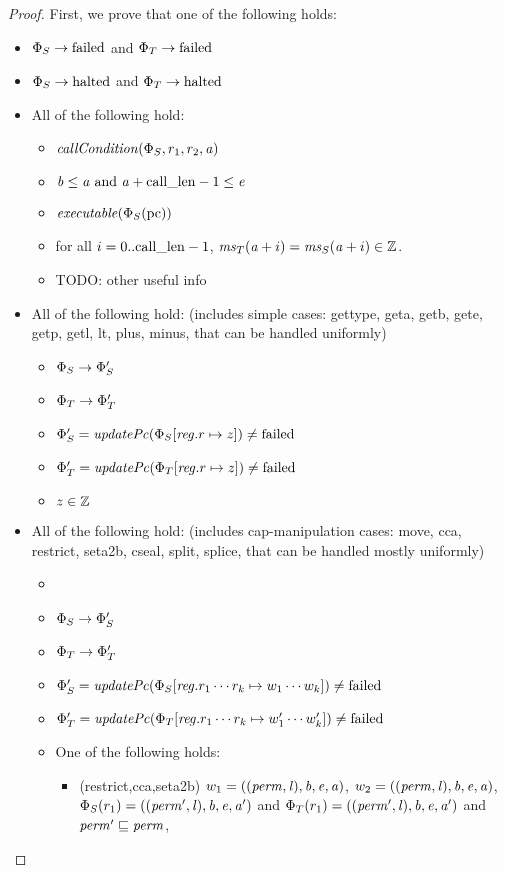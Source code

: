 \documentclass[a4paper]{article}
\begin{document}
\begin{proof}
{\color{DarkGreen}
First, we prove that one of the following holds:
\begin{itemize}
\item $\Phi_S \rightarrow \mathrm{failed}$ and $\Phi_T \rightarrow\mathrm{failed}$
\item $\Phi_S \rightarrow \mathrm{halted}$ and $\Phi_T \rightarrow\mathrm{halted}$
\item All of the following hold:
  \begin{itemize}
  \item $\callCond{\Phi_S,r_1,r_2,\aaddr}$
  \item $\mathit{b} \leq \mathit{a} \text{ and } \mathit{a} + \mathrm{call\_len}-1 \leq \mathit{e}$
  \item $\exec{\Phi_S(\pcreg)}$
  \item for all $i = 0..\mathrm{call\_len}-1$, $\mathit{ms}_T(\mathit{a}+i) = \mathit{ms}_S(\mathit{a}+i) \in \mathbb{Z}$.
  \item TODO: other useful info
  \end{itemize}
\item All of the following hold: (includes simple cases: gettype, geta, getb, gete, getp, getl, lt, plus, minus, that can be handled uniformly)
  \begin{itemize}
  \item $\Phi_S \rightarrow \Phi_S'$
  \item $\Phi_T \rightarrow \Phi_T'$
  \item $\Phi_S' = \updPcAddr{\Phi_S\updReg{r}{z}} \neq \failed$
  \item $\Phi_T' = \updPcAddr{\Phi_T\updReg{r}{z}} \neq \failed$
  \item $z \in \mathbb{Z}$
  \end{itemize}
\item All of the following hold: (includes cap-manipulation cases: move, cca, restrict, seta2b, cseal, split, splice, that can be handled mostly uniformly)
  \begin{itemize}
  \item \item $\Phi_S \rightarrow \Phi_S'$
  \item $\Phi_T \rightarrow \Phi_T'$
  \item $\Phi_S' = \updPcAddr{\Phi_S\updReg{r_1\cdots r_k}{w_1\cdots w_k}}\neq \failed$
  \item $\Phi_T' = \updPcAddr{\Phi_T\updReg{r_1\cdots r_k}{w_1'\cdots w_k'}} \neq \failed$
  \item One of the following holds:
    \begin{itemize}
    \item (restrict,cca,seta2b) $w_1 = ((\mathit{perm},\mathit{l}),\mathit{b},\mathit{e},\mathit{a})$, $w_2 = ((\mathit{perm},\mathit{l}),\mathit{b},\mathit{e},\mathit{a})$, $\Phi_S(r_1) = ((\mathit{perm}',\mathit{l}),\mathit{b},\mathit{e},\mathit{a}')$ and $\Phi_T(r_1) = ((\mathit{perm}',\mathit{l}),\mathit{b},\mathit{e},\mathit{a}')$ and $\mathit{perm}' \sqsubseteq\mathit{perm}$,

\end{itemize}
\end{itemize}
\end{itemize}}
\end{proof}
\end{document}
